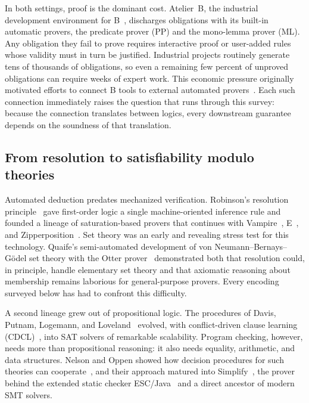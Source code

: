 In both settings, proof is the dominant cost.
Atelier~B, the industrial development environment for
B~\cite{lecomte2024proving}, discharges obligations with its built-in automatic
provers, the predicate prover (PP) and the mono-lemma prover (ML). Any obligation
they fail to prove requires interactive proof or user-added rules whose validity
must in turn be justified. Industrial projects routinely generate tens of
thousands of obligations, so even a remaining few percent of unproved
obligations can require weeks of expert work. This economic pressure originally
motivated efforts to connect B tools to external automated
provers~\cite{deharbe2010automatic,mentre2012discharging}. Each such connection
immediately raises the question that runs through this survey: because the
connection translates between logics, every downstream guarantee depends on
the soundness of that translation.

\subsection{From resolution to satisfiability modulo theories}
\label{subsec:rw-atp-smt}

Automated deduction predates mechanized verification.
Robinson's resolution principle~\cite{robinson1965resolution} gave first-order
logic a single machine-oriented inference rule and founded a lineage of
saturation-based provers that continues with
Vampire~\cite{kovacs2013vampire}, E~\cite{schulz2013e}, and
Zipperposition~\cite{bentkamp2023higherorder}. Set theory was an early and
revealing stress test for this technology. Quaife's semi-automated development
of von Neumann--Bernays--G\"odel set theory with the Otter
prover~\cite{quaife1992nbg} demonstrated both that resolution could, in
principle, handle elementary set theory and that axiomatic reasoning about
membership remains laborious for general-purpose provers. Every encoding
surveyed below has had to confront this difficulty.

A second lineage grew out of propositional logic.
The procedures of Davis, Putnam, Logemann, and
Loveland~\cite{davis1960computing,davis1962machine} evolved, with
conflict-driven clause learning
(CDCL)~\cite{marquessilva1999grasp,biere2021handbook}, into SAT solvers of
remarkable scalability. Program checking, however, needs more than
propositional reasoning: it also needs equality, arithmetic, and data
structures. Nelson and Oppen showed how decision procedures for such theories
can cooperate~\cite{nelson1979simplification}, and their approach matured into
Simplify~\cite{detlefs2005simplify}, the prover behind the extended static
checker ESC/Java~\cite{flanagan2002escjava} and a direct ancestor of modern SMT
solvers.

